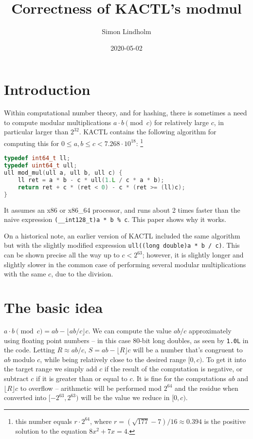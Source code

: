 \documentclass{article}
\title{Correctness of KACTL's modmul}
\author{Simon Lindholm}
\date{2020-05-02}
\begin{document}
\maketitle

\section{Introduction}

Within computational number theory, and for hashing, there is sometimes a need to compute modular multiplications $a \cdot b \pmod{c}$ for relatively large $c$, in particular larger than $2^{32}$. KACTL contains the following algorithm for computing this for $0 \le a, b \le c < 7.268\cdot 10^{18}$: \footnote{this number equals $r \cdot 2^{64}$, where $r = (\sqrt{177} - 7) / 16 \approx 0.394$ is the positive solution to the equation $8x^2 + 7x = 4$.}

\begin{lstlisting}[language=C++]
typedef int64_t ll;
typedef uint64_t ull;
ull mod_mul(ull a, ull b, ull c) {
    ll ret = a * b - c * ull(1.L / c * a * b);
    return ret + c * (ret < 0) - c * (ret >= (ll)c);
}
\end{lstlisting}

\noindent
It assumes an x86 or x86\_64 processor, and runs about 2 times faster than the naive expression \lstinline{(__int128_t)a * b % c}.
This paper shows why it works.

On a historical note, an earlier version of KACTL included the same algorithm but with the slightly modified expression \texttt{ull((long double)a * b / c)}. This can be shown precise all the way up to $c < 2^{63}$; however, it is slightly longer and slightly slower in the common case of performing several modular multiplications with the same $c$, due to the division.

\section{The basic idea}

$a \cdot b \pmod{c} = ab - \lfloor ab/c \rfloor c$. We can compute the value $ab/c$ approximately using floating point numbers -- in this case 80-bit long doubles, as seen by \texttt{1.0L} in the code. Letting $R \approx ab/c$, $S = ab - \lfloor R \rfloor c$ will be a number that's congruent to $ab$ modulo $c$, while being relatively close to the desired range $[0, c)$. To get it into the target range we simply add $c$ if the result of the computation is negative, or subtract $c$ if it is greater than or equal to $c$. It is fine for the computations $ab$ and $\lfloor R \rfloor c$ to overflow -- arithmetic will be performed mod $2^{64}$ and the residue when converted into $[-2^{63}, 2^{63})$ will be the value we reduce in $[0, c)$.
\end{document}
